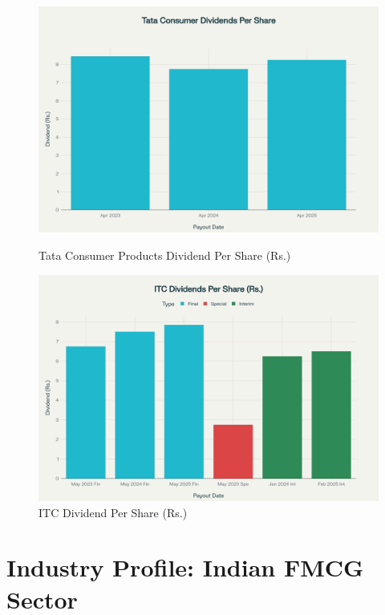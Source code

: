 \documentclass[12pt, a4paper]{report}
\begin{document}
\begin{figure}[H]
    \centering
    \begin{minipage}{0.48\textwidth}
        \centering
        \includegraphics[width=\textwidth]{assets/Dividend_Payout_Tata.png}
        \caption{Tata Consumer Products Dividend Per Share (Rs.)}
    \end{minipage}
    \hfill
    \begin{minipage}{0.48\textwidth}
        \centering
        \includegraphics[width=\textwidth]{assets/Dividend_Payout_ITC.png}
        \caption{ITC Dividend Per Share (Rs.)}
    \end{minipage}
\end{figure}


\chapter{Industry Profile: Indian FMCG Sector}
\end{document}
